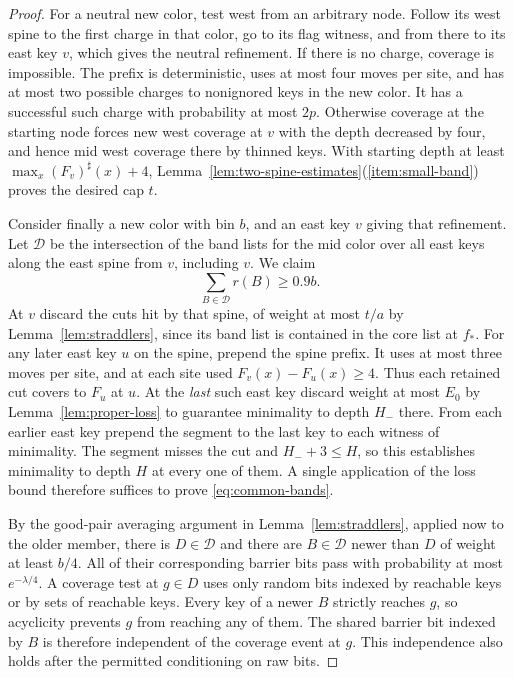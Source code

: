 \begin{proof}
For a neutral new color, test west from an arbitrary node. Follow its
west spine to the first charge in that color, go to its flag witness,
and from there to its east key \(v\), which gives the neutral
refinement. If there is no charge, coverage is impossible. The prefix
is deterministic, uses at most four moves per site, and has at most
two possible charges to nonignored keys in the new color. It has a
successful such charge with probability at most \(2p\). Otherwise
coverage at the starting node forces new west coverage at \(v\)
with the depth decreased by four, and hence mid west coverage there
by thinned keys. With starting depth at least
\(\max_x (F_v)^\sharp(x)+4\), Lemma~\ref{lem:two-spine-estimates}(\ref{item:small-band}) proves the
desired cap \(t\).

Consider finally a new color with bin \(b\), and an east key \(v\)
giving that refinement. Let \(\mathcal D\) be the intersection of the
band lists for the mid color over all east keys along the east spine
from \(v\), including \(v\). We claim
\begin{equation}\label{eq:common-bands}
 \sum_{B\in\mathcal D}r(B)\ge 0.9b .
\end{equation}
At \(v\) discard the cuts hit by that spine, of weight at most \(t/a\)
by Lemma~\ref{lem:straddlers}, since its band list is contained in
the core list at \(f_*\). For any later east key \(u\) on the spine,
prepend the spine prefix. It uses at most three moves per site, and
at each site used \(F_v(x)-F_u(x)\ge4\). Thus each retained cut
covers to \(F_u\) at \(u\). At the \emph{last} such east key discard
weight at most \(E_0\) by Lemma~\ref{lem:proper-loss} to guarantee
minimality to depth \(H_-\) there. From each earlier east key prepend
the segment to the last key to each witness of minimality. The segment
misses the cut and \(H_-+3\le H\), so this establishes minimality to
depth \(H\) at every one of them. A single application of the loss
bound therefore suffices to prove \eqref{eq:common-bands}.

By the good-pair averaging argument in Lemma~\ref{lem:straddlers},
applied now to the older member, there is \(D\in\mathcal D\) and
there are \(B\in\mathcal D\) newer than \(D\) of weight at least
\(b/4\). All of their corresponding barrier bits pass with probability
at most \(e^{-\lambda/4}\). A coverage test at \(g\in D\) uses only random bits indexed by
reachable keys or by sets of reachable keys. Every key of a newer
\(B\) strictly reaches \(g\), so acyclicity prevents \(g\) from
reaching any of them. The shared barrier bit indexed by \(B\)
is therefore independent of the coverage event at \(g\). This
independence also holds after the permitted conditioning on raw bits.


\end{proof}
